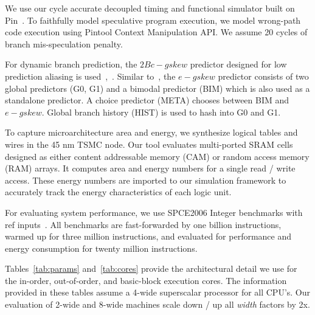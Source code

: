 We use our cycle accurate decoupled timing and functional simulator built on
Pin~\cite{pin}. To faithfully model speculative program execution,  we model
wrong-path code execution using Pintool Context Manipulation API. We assume 20
cycles of branch mis-speculation penalty.

For dynamic branch prediction, the $2Bc{-}gskew$ predictor designed for low
prediction aliasing is used~\cite{ref:seznec1999aliased},~\cite{ref:EV8}.
Similar to~\cite{ref:EV8}, the $e{-}gskew$ predictor consists of two global
predictors (G0, G1) and a bimodal predictor (BIM) which is also used as a
standalone predictor. A choice predictor (META) chooses between BIM and
$e{-}gskew$. Global branch history (HIST) is used to hash into G0 and G1.

To capture microarchitecture area and energy, we synthesize logical tables and
wires in the 45 nm TSMC node. Our tool evaluates multi-ported SRAM cells
designed as either content addressable memory (CAM) or random access memory
(RAM) arrays.  It computes area and energy numbers for a single read / write
access. These energy numbers are imported to our simulation framework to
accurately track the energy characteristics of each logic unit.

For evaluating system performance, we use SPCE2006 Integer benchmarks with ref
inputs~\cite{spec}. All benchmarks are fast-forwarded by one billion
instructions, warmed up for three million instructions, and evaluated for
performance and energy consumption for twenty million instructions.

Tables~\ref{tab:params} and~\ref{tab:cores} provide the architectural detail we
use for the in-order, out-of-order, and basic-block execution cores. The
information provided in these tables assume a 4-wide superscalar processor for
all CPU's. Our evaluation of 2-wide and 8-wide machines scale down / up all
{\it{width}} factors by 2x.

